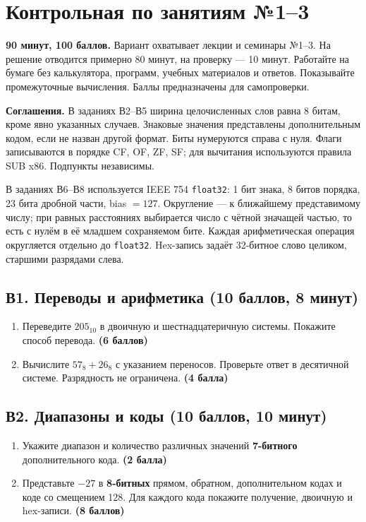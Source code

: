 \chapter{Контрольная по занятиям №1--3}\label{mock13:start}
\textbf{90 минут, 100 баллов.} Вариант охватывает лекции и семинары №1--3. На решение отводится примерно 80 минут, на проверку --- 10 минут. Работайте на бумаге без калькулятора, программ, учебных материалов и ответов. Показывайте промежуточные вычисления. Баллы предназначены для самопроверки.

\textbf{Соглашения.} В заданиях В2--В5 ширина целочисленных слов равна 8 битам, кроме явно указанных случаев. Знаковые значения представлены дополнительным кодом, если не назван другой формат. Биты нумеруются справа с нуля. Флаги записываются в порядке CF, OF, ZF, SF; для вычитания используются правила SUB x86. Подпункты независимы.

В заданиях В6--В8 используется IEEE 754 \texttt{float32}: 1 бит знака, 8 битов порядка, 23 бита дробной части, bias $=127$. Округление --- к ближайшему представимому числу; при равных расстояниях выбирается число с чётной значащей частью, то есть с нулём в её младшем сохраняемом бите. Каждая арифметическая операция округляется отдельно до \texttt{float32}. Hex-запись задаёт 32-битное слово целиком, старшими разрядами слева.

\section{В1. Переводы и арифметика (10 баллов, 8 минут)}\label{task:v1}
\begin{enumerate}
    \item Переведите $205_{10}$ в двоичную и шестнадцатеричную системы. Покажите способ перевода. \textbf{(6 баллов)}
    \item Вычислите $57_8+26_8$ с указанием переносов. Проверьте ответ в десятичной системе. Разрядность не ограничена. \textbf{(4 балла)}
\end{enumerate}

\section{В2. Диапазоны и коды (10 баллов, 10 минут)}\label{task:v2}
\begin{enumerate}
    \item Укажите диапазон и количество различных значений \textbf{7-битного} дополнительного кода. \textbf{(2 балла)}
    \item Представьте $-27$ в \textbf{8-битных} прямом, обратном, дополнительном кодах и коде со смещением 128. Для каждого кода покажите получение, двоичную и hex-записи. \textbf{(8 баллов)}
\end{enumerate}

